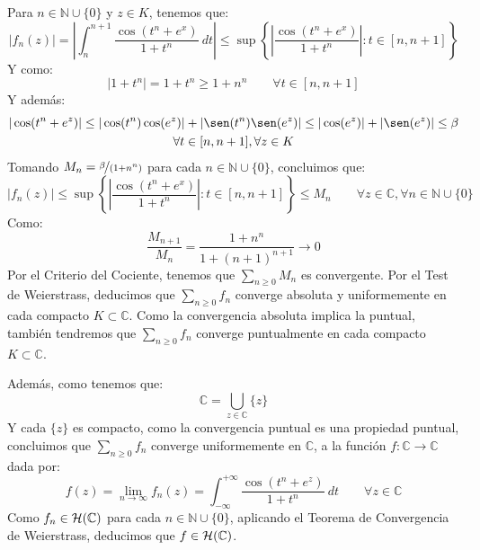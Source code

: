 \documentclass[12pt]{article}
\begin{document}
\begin{ejercicio}[2.5 puntos]
\begin{enumerate}[label=\alph*)]
                Para $n\in \mathbb{N}\cup \{0\}$ y $z\in K$, tenemos que:
                \begin{equation*}
                    |f_n(z)| = \left|\int_{n}^{n+1} \dfrac{\cos(t^n+e^x)}{1+t^n}~dt \right| \leq \sup\left\{\left|\dfrac{\cos(t^n+e^x)}{1+t^n}\right| : t\in [n,n+1]\right\}
                \end{equation*}
                Y como:
                \begin{equation*}
                    |1+t^n| = 1+t^n \geq 1+n^n \qquad \forall t\in [n,n+1]
                \end{equation*}
                Y además:
                \begin{multline*}
                    |\cos(t^n+e^z)| \leq |\cos(t^n)\cos(e^z)| + |\sen(t^n)\sen(e^z)| \leq |\cos(e^z)| + |\sen(e^z)|\leq \beta \\ \forall t\in [n,n+1], \forall z\in K
                \end{multline*}
                Tomando $M_n = \nicefrac{\beta}{(1+n^n)}$ para cada $n\in \mathbb{N}\cup \{0\}$, concluimos que:
                \begin{equation*}
                    |f_n(z)| \leq \sup\left\{\left|\dfrac{\cos(t^n+e^x)}{1+t^n}\right| : t\in [n,n+1]\right\} \leq M_n \qquad \forall z\in \mathbb{C}, \forall n\in \mathbb{N}\cup \{0\}
                \end{equation*}
                Como:
                \begin{equation*}
                    \dfrac{M_{n+1}}{M_n} = \dfrac{1+n^n}{1+{(n+1)}^{n+1}} \to 0
                \end{equation*}
                Por el Criterio del Cociente, tenemos que $\sum\limits_{n\geq 0}M_n$ es convergente. Por el Test de Weierstrass, deducimos que $\sum\limits_{n\geq 0}f_n$ converge absoluta y uniformemente en cada compacto $K\subset \mathbb{C}$. Como la convergencia absoluta implica la puntual, también tendremos que $\sum\limits_{n\geq 0}f_n$ converge puntualmente en cada compacto $K\subset \mathbb{C}$.

                Además, como tenemos que:
                \begin{equation*}
                    \mathbb{C} = \bigcup_{z\in \mathbb{C}} \{z\}
                \end{equation*}
                Y cada $\{z\}$ es compacto, como la convergencia puntual es una propiedad puntual, concluimos que $\sum\limits_{n\geq 0}f_n$ converge uniformemente en $\mathbb{C}$, a la función $f:\mathbb{C}\to \mathbb{C}$ dada por:
                \begin{equation*}
                    f(z) = \lim_{n\to\infty} f_n(z) = \int_{-\infty}^{+\infty} \dfrac{\cos(t^n+e^z)}{1+t^n}~dt  \qquad \forall z\in \mathbb{C}
                \end{equation*} 
                Como $f_n\in \mathcal{H}(\mathbb{C})$ para cada $n\in \mathbb{N}\cup\{0\}$, aplicando el Teorema de Convergencia de Weierstrass, deducimos que $f\in \mathcal{H}(\mathbb{C})$.
        \end{enumerate}
    \end{ejercicio}
\end{document}
